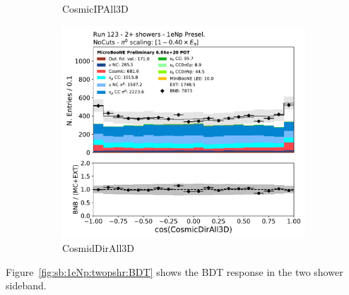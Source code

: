 \begin{figure}[H]
\begin{subfigure}{0.3\textwidth}
    \caption{CosmicIPAll3D}
    \end{subfigure}
    \begin{subfigure}{0.3\textwidth}
    \includegraphics[width=1.0\textwidth]{Sidebands/Figures/1eNp/TwoShower/TwoPShr_NP_None_pi0e040/CosmicDirAll3D.pdf}
    \caption{CosmidDirAll3D}
    \end{subfigure}
    \caption{} 
    \label{fig:TWOP_1eNp_5}
\end{figure}
Figure~\ref{fig:sb:1eNp:twopshr:BDT} shows the \npsel BDT response in the two shower sideband.

